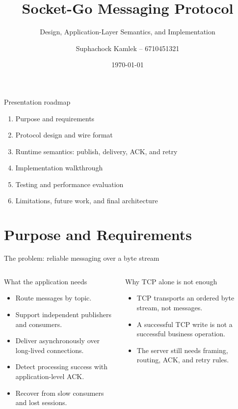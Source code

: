 \documentclass[aspectratio=169,10pt]{beamer}
\title[Socket-Go Protocol]{Socket-Go Messaging Protocol}
\subtitle{Design, Application-Layer Semantics, and Implementation}
\author{Suphachock Kamlek -- 6710451321}
\institute{Computer Communications \/ Computer Science}
\date{\today}
\begin{document}
\begin{frame}
  \titlepage
\end{frame}

\begin{frame}{Presentation roadmap}
  \begin{enumerate}
    \item Purpose and requirements
    \item Protocol design and wire format
    \item Runtime semantics: publish, delivery, ACK, and retry
    \item Implementation walkthrough
    \item Testing and performance evaluation
    \item Limitations, future work, and final architecture
  \end{enumerate}
\end{frame}

\section{Purpose and Requirements}

\begin{frame}{The problem: reliable messaging over a byte stream}
  \begin{columns}[T,onlytextwidth]
      \begin{block}{What the application needs}
        \begin{itemize}
          \item Route messages by topic.
          \item Support independent publishers and consumers.
          \item Deliver asynchronously over long-lived connections.
          \item Detect processing success with application-level ACK.
          \item Recover from slow consumers and lost sessions.
        \end{itemize}
      \end{block}
      \begin{block}{Why TCP alone is not enough}
        \begin{itemize}
          \item TCP transports an ordered byte stream, not messages.
          \item A successful TCP write is not a successful business operation.
          \item The server still needs framing, routing, ACK, and retry rules.
        \end{itemize}
      \end{block}
  \end{columns}
\end{frame}
\end{document}
